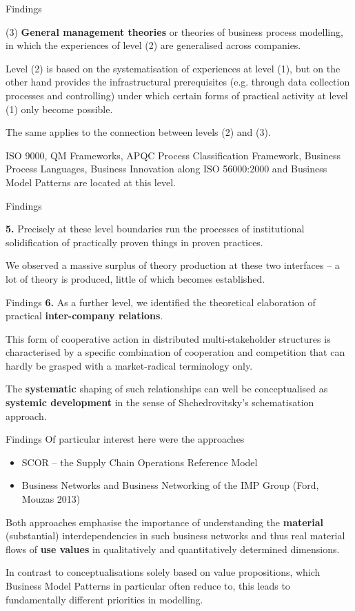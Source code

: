 \documentclass{beamer}
\begin{document}
\begin{frame}{Findings}

(3) \textbf{General management theories} or theories of business process
modelling, in which the experiences of level (2) are generalised across
companies.

Level (2) is based on the systematisation of experiences at level (1), but on
the other hand provides the infrastructural prerequisites (e.g. through data
collection processes and controlling) under which certain forms of practical
activity at level (1) only become possible.

The same applies to the connection between levels (2) and (3).

ISO 9000, QM Frameworks, APQC Process Classification Framework, Business
Process Languages, Business Innovation along ISO 56000:2000 and Business Model
Patterns are located at this level.

\end{frame}
\begin{frame}{Findings}

\textbf{5.}  Precisely at these level boundaries run the processes of
institutional solidification of practically proven things in proven practices.

We observed a massive surplus of theory production at these two interfaces --
a lot of theory is produced, little of which becomes established.

\end{frame}
\begin{frame}{Findings}
\textbf{6.}  As a further level, we identified the theoretical elaboration of
practical \textbf{inter-company relations}.

This form of cooperative action in distributed multi-stakeholder structures is
characterised by a specific combination of cooperation and competition that
can hardly be grasped with a market-radical terminology only.

The \textbf{systematic} shaping of such relationships can well be
conceptualised as \textbf{systemic development} in the sense of
Shchedrovitsky's schematisation approach.

\end{frame}
\begin{frame}{Findings}
Of particular interest here were the approaches 
\begin{itemize}
\item SCOR -- the Supply Chain Operations Reference Model
\item Business Networks and Business Networking of the IMP Group (Ford, Mouzas
  2013)
\end{itemize}
Both approaches emphasise the importance of understanding the
\textbf{material} (substantial) interdependencies in such business networks
and thus real material flows of \textbf{use values} in qualitatively and
quantitatively determined dimensions.

In contrast to conceptualisations solely based on value propositions, which
Business Model Patterns in particular often reduce to, this leads to
fundamentally different priorities in modelling.

\end{frame}
\end{document}
